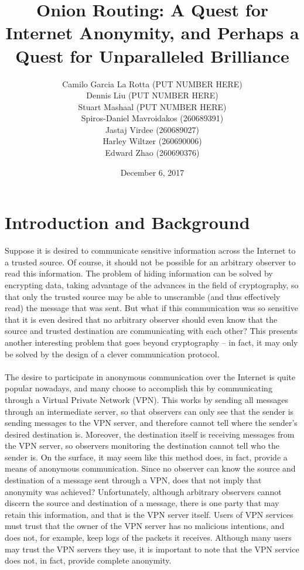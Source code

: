 \documentclass[10pt]{report}
\title{Onion Routing: A Quest for Internet Anonymity, and Perhaps a Quest for Unparalleled
Brilliance}
\author{Camilo Garcia La Rotta (PUT NUMBER HERE)\\Dennis Liu (PUT NUMBER HERE)\\Stuart
Mashaal (PUT NUMBER HERE)\\Spiros-Daniel
Mavroidakos (260689391)\\Jastaj Virdee (260689027)\\Harley Wiltzer (260690006)\\Edward Zhao
(260690376)}
\date{December 6, 2017}
\begin{document}
\maketitle
\tableofcontents
\doublespacing
\chapter{Introduction and Background}
Suppose it is desired to communicate sensitive information across the Internet to a trusted source.
Of course, it should not be possible for an arbitrary observer to read this information. The problem
of hiding information can be solved by encrypting data, taking advantage of the advances in the
field of cryptography, so that only the trusted source may be able to unscramble (and thus
effectively read) the message that was sent. But what if this communication was so sensitive that it
is even desired that no arbitrary observer should even know that the source and trusted destination
are communicating with each other? This presents another interesting problem that goes beyond
cryptography -- in fact, it may only be solved by the design of a clever communication protocol.\\\\
The desire to participate in anonymous communication over the Internet is quite popular nowadays,
and many choose to accomplish this by communicating through a Virtual Private Network (VPN). This
works by sending all messages through an intermediate server, so that observers can only see that
the sender is sending messages to the VPN server, and therefore cannot tell where the sender's
desired destination is. Moreover, the destination itself is receiving messages from the VPN server,
so observers monitoring the destination cannot tell who the sender is. On the surface, it may seem
like this method does, in fact, provide a means of anonymous communication. Since no observer can
know the source and destination of a message sent through a VPN, does that not imply that anonymity
was achieved? Unfortunately, although arbitrary observers cannot discern the source and destination
of a message, there is one party that may retain this information, and that is the VPN
server itself. Users of VPN services must trust that the owner of the VPN server has no malicious
intentions, and does not, for example, keep logs of the packets it receives. Although many users may
trust the VPN servers they use, it is important to note that the VPN service does not, in fact,
provide complete anonymity.\\\\
\end{document}
